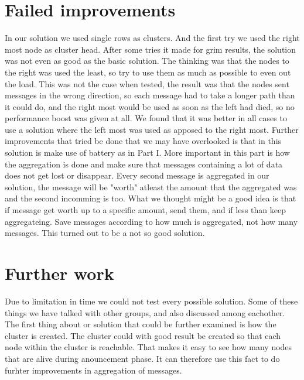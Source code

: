 \documentclass{article}
\begin{document}
  \section{Failed improvements}
  In our solution we used single rows as clusters. And the first try we used the 
  right most node as cluster head. After some tries it made for grim results, the solution 
  was not even as good as the basic solution. The thinking was that the nodes
  to the right was used the least, so try to use them as much as possible to
  even out the load. This was not the case when tested, the result was that
  the nodes sent messages in the wrong direction, so each message had to take a 
  longer path than it could do, and the right most would be used as soon as the
  left had died, so no performance boost was given at all. We found that it
  was better in all cases to use a solution where the left most
  was used as apposed to the right most. Further improvements that tried be done
  that we may have overlooked is that in this solution is make use of battery
  as in Part I. More important in this part is how the aggregation is done
  and make sure that messages containing a lot of data does not get lost or
  disappear. Every second message is aggregated in our solution, the message 
  will be "worth" atleast the amount that the aggregated was and the second incomming
  is too. What we thought might be a good idea is that if message get worth up to a
  specific amount, send them, and if less than keep aggregateing. Save messages
  according to how much is aggregated, not how many messages. This turned out to
  be a not so good solution.
  \section{Further work}
  Due to limitation in time we could not test every possible solution. Some 
  of these things we have talked with other groups, and also discussed among
  eachother. The first thing about or solution that could be further examined
  is how the cluster is created. The cluster could with good result be created
  so that each node within the cluster is reachable. That makes it easy to see
  how many nodes that are alive during anouncement phase. It can therefore 
  use this fact to do furhter improvements in aggregation of messages.

  
\end{document}
